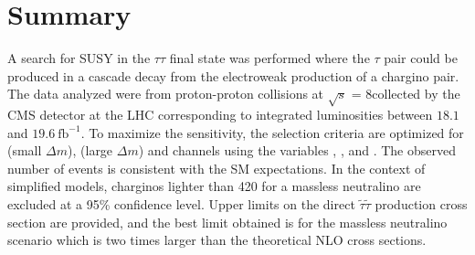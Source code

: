 \section{Summary}
\label{sect:conclusion}
A search for SUSY in the $\tau\tau$ final state was performed where the
$\tau$ pair could be produced in a cascade decay from the electroweak production of a chargino pair.  The data analyzed were from proton-proton collisions
at $\sqrt{s}$ = 8\TeV collected by the CMS detector at the LHC corresponding to integrated luminosities between $18.1$ and $19.6~\mathrm{fb}^{-1}$. 
To maximize the sensitivity, the selection criteria are optimized for \tauTau (small $\Delta m$), 
\tauTau (large $\Delta m$) and \leptonTau channels using the variables \mttwo, \tauMT, and \SumMT.
The observed number of events is consistent with the SM expectations. 
In the context of simplified models, charginos lighter than 420\GeV 
for a massless neutralino are excluded at a 95\% confidence level. 
Upper limits on the direct $\tilde{\tau}\tilde{\tau}$ production cross section are provided, 
and the best limit obtained is for the massless neutralino scenario which is two times
larger than the theoretical NLO cross sections. 

